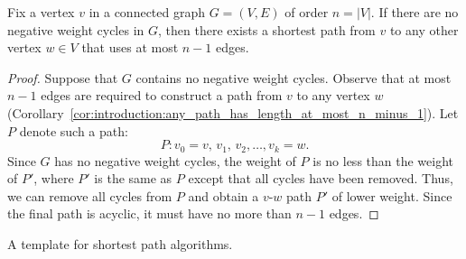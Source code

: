\begin{lemma}
\label{lem:graph_algorithms:shortest_path_length}
Fix a vertex $v$ in a connected graph $G = (V,E)$ of order
$n = |V|$. If there are no negative weight
cycles in $G$, then there exists a shortest
path from $v$ to any other vertex $w \in V$ that
uses at most $n - 1$ edges.
\end{lemma}

\begin{proof}
Suppose that $G$ contains no negative weight cycles. Observe that at
most $n - 1$ edges are required to construct a path from $v$ to any
vertex $w$
(Corollary~\ref{cor:introduction:any_path_has_length_at_most_n_minus_1}).
Let $P$ denote such a path:
\[
P: v_0 = v,\, v_1,\, v_2, \dots, v_k = w.
\]
Since $G$ has no negative weight cycles, the
weight of $P$ is no less than the weight of $P'$, where $P'$ is the
same as $P$ except that all cycles have been removed. Thus, we can
remove all cycles from $P$ and obtain a $v$-$w$ path $P'$
of lower weight. Since the final path is acyclic, it must have no more
than $n - 1$ edges.
\end{proof}

\begin{algorithm}[!htpb]

\caption{A template for shortest path algorithms.}
\label{alg:graph_algorithms:generic_shortest_path_algorithm}
\end{algorithm}

